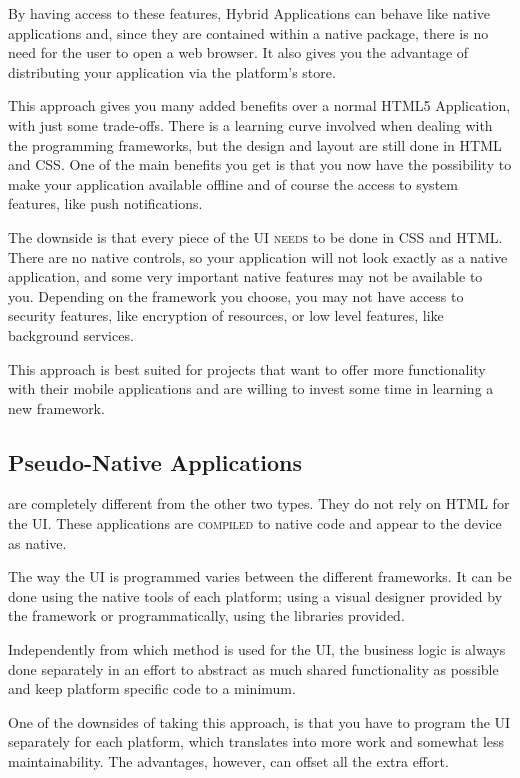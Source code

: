 By having access to these features, Hybrid Applications can behave like native applications and, since they are contained within a native package, there is no need for the user to open a web browser. It also gives you the advantage of distributing your application via the platform's store.

This approach gives you many added benefits over a normal HTML5 Application, with just some trade-offs. There is a learning curve involved when dealing with the programming frameworks, but the design and layout are still done in HTML and CSS. One of the main benefits you get is that you now have the possibility to make your application available offline and of course the access to system features, like push notifications. 

The downside is that every piece of the \ac{UI} \textsc{needs} to be done in CSS and HTML. There are no native controls, so your application will not look exactly as a native application, and some very important native features may not be available to you. Depending on the framework you choose, you may not have access to security features, like encryption of resources, or low level features, like background services.  

This approach is best suited for projects that want to offer more functionality with their mobile applications and are willing to invest some time in learning a new framework.  

\subsection{Pseudo-Native Applications}\label{sec:pseudo_app}
 are completely different from the other two types. They do not rely on HTML for the \ac{UI}. These applications are \textsc{compiled} to native code and appear to the device as native.


The way the \ac{UI} is programmed varies between the different frameworks. It can be done using the native tools of each platform; using a visual designer provided by the framework or programmatically, using the libraries provided.

Independently from which method is used for the \ac{UI}, the business logic is always done separately in an effort to abstract as much shared functionality as possible and keep platform specific code to a minimum.

One of the downsides of taking this approach, is that you have to program the \ac{UI} separately for each platform, which translates into more work and somewhat less maintainability. The advantages, however, can offset all the extra effort.

